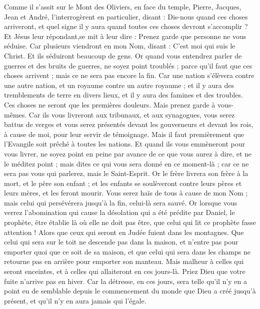 \begin{multicols}{2}
Comme il s'assit sur le Mont des Oliviers, en face du temple, Pierre, Jacques, Jean et André, l'interrogèrent en particulier,
disant : Dis-nous quand ces choses arriveront, et quel signe il y aura quand toutes ces choses devront s'accomplir ?
Et Jésus leur répondant,se mit à leur dire : Prenez garde que personne ne vous séduise.
Car plusieurs viendront en mon Nom, disant : C'est moi qui suis le Christ. Et ils séduiront beaucoup de gens.
Or quand vous entendrez parler de guerres et des bruits de guerres, ne soyez point troublés ; parce qu'il faut que ces choses arrivent ; mais ce ne sera pas encore la fin.
Car une nation s'élèvera contre une autre nation, et un royaume contre un autre royaume ; et il y aura des tremblements de terre en divers lieux, et il y aura des famines et des troubles. Ces choses ne seront que les premières douleurs.
Mais prenez garde à vous-mêmes. Car ils vous livreront aux tribunaux, et aux synagogues, vous serez battus de verges et vous serez présentés devant les gouverneurs et devant les rois, à cause de moi, pour leur servir de témoignage.
Mais il faut premièrement que l'Evangile soit prêché à toutes les nations.
Et quand ils vous emmèneront pour vous livrer, ne soyez point en peine par avance de ce que vous aurez à dire, et ne le méditez point ; mais dites ce qui vous sera donné en ce moment-là ; car ce ne sera pas vous qui parlerez, mais le Saint-Esprit.
Or le frère livrera son frère à la mort, et le père son enfant ; et les enfants se soulèveront contre leurs pères et leurs mères, et les feront mourir.
Vous serez haïs de tous à cause de mon Nom ; mais celui qui persévérera jusqu'à la fin, celui-là sera sauvé.
Or lorsque vous verrez l'abomination qui cause la désolation qui a été prédite par Daniel, le prophète, être établie là où elle ne doit pas être, que celui qui lit ce prophète fasse attention ! Alors que ceux qui seront en Judée fuient dans les montagnes.
Que celui qui sera sur le toit ne descende pas dans la maison, et n'entre pas pour emporter quoi que ce soit de sa maison,
et que celui qui sera dans les champs ne retourne pas en arrière pour emporter son manteau.
Mais malheur à celles qui seront enceintes, et à celles qui allaiteront en ces jours-là.
Priez Dieu que votre fuite n'arrive pas en hiver.
Car la détresse, en ces jours, sera telle qu'il n'y en a point eu de semblable depuis le commencement du monde que Dieu a créé jusqu'à présent, et qu'il n'y en aura jamais qui l'égale.

\end{multicols}
